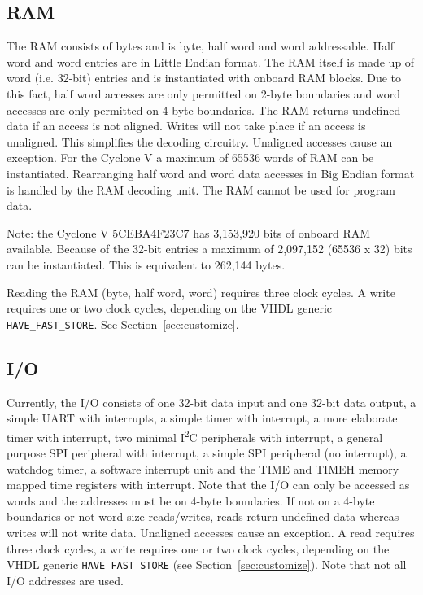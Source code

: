 \documentclass[12pt]{article}
\begin{document}
\subsection{RAM}
\label{sec:ram}
The RAM consists of bytes and is byte, half word and word addressable. Half word and word entries are in Little Endian format. The RAM itself is made up of word (i.e. 32-bit) entries and is instantiated with onboard RAM blocks. Due to this fact, half word accesses are only permitted on 2-byte boundaries and word accesses are only permitted on 4-byte boundaries. The RAM returns undefined data if an access is not aligned. Writes will not take place if an access is unaligned. This simplifies the decoding circuitry. Unaligned accesses cause an exception. For the Cyclone V a maximum of 65536 words of RAM can be instantiated. Rearranging half word and word data accesses in Big Endian format is handled by the RAM decoding unit. The RAM cannot be used for program data.

Note: the Cyclone V 5CEBA4F23C7 has 3,153,920 bits of onboard RAM available. Because of the 32-bit entries a maximum of 2,097,152 (65536 x 32) bits can be instantiated. This is equivalent to 262,144 bytes.

Reading the RAM (byte, half word, word) requires three clock cycles. A write requires one or two clock cycles, depending on the VHDL generic \lstinline|HAVE_FAST_STORE|. See Section~\ref{sec:customize}.

\subsection{I/O}
\label{sec/io}
Currently, the I/O consists of one 32-bit data input and one 32-bit data output, a simple UART with interrupts, a simple timer with interrupt, a more elaborate timer with interrupt, two minimal I\textsuperscript{2}C peripherals with interrupt, a general purpose SPI peripheral with interrupt, a simple SPI peripheral (no interrupt), a watchdog timer, a software interrupt unit and the TIME and TIMEH memory mapped time registers with interrupt. Note that the I/O can only be accessed as words and the addresses must be on 4-byte boundaries. If not on a 4-byte boundaries or not word size reads/writes, reads return undefined data whereas writes will not write data. Unaligned accesses cause an exception. A read requires three clock cycles, a write requires one or two clock cycles, depending on the VHDL generic \lstinline|HAVE_FAST_STORE| (see Section~\ref{sec:customize}). Note that not all I/O addresses are used.
\end{document}

